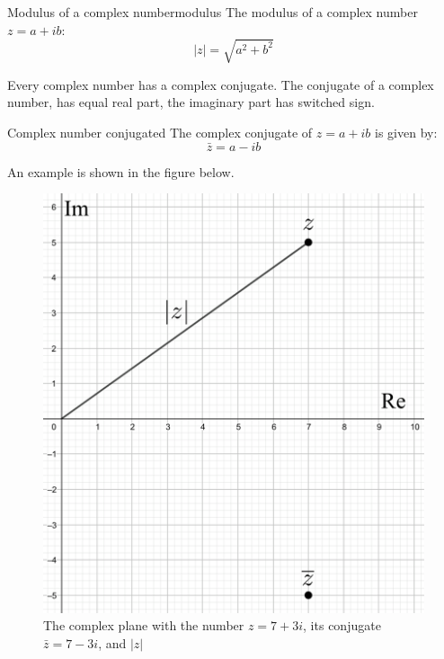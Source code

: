 \begin{definition}{Modulus of a complex number}{modulus}
The modulus of a complex number $z=a+ib$:
$$\mid z\mid=\sqrt{a^2+b^2}$$
\end{definition}
\noindent
Every complex number has a complex conjugate. The conjugate of a complex number, has equal real part, the imaginary part has switched sign.

\begin{definition}{Complex number conjugated}{}
The complex conjugate of $z=a+ib$ is given by:
$$\bar{z}=a-ib$$
\end{definition}
\noindent An example is shown in the figure below.  
\begin{figure}[H]
\centering
\includegraphics[scale=0.2]{fig/img/complex_plan}
\caption{The complex plane with the number $z=7+3i$, its conjugate $\bar{z}=7-3i$, and $|z|$}
\end{figure}


